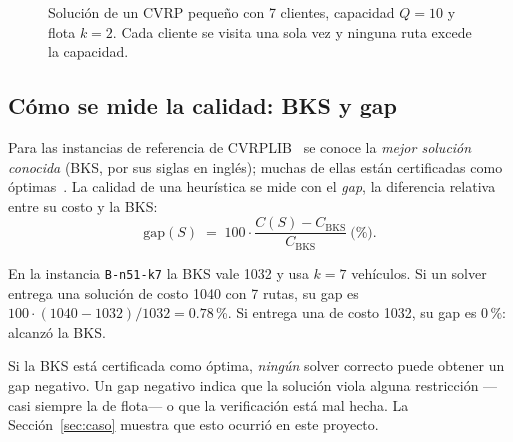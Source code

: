 \documentclass[11pt,a4paper]{article}
\newcommand{\tsl}[1]{\texttt{\small #1}}
\begin{document}
\begin{figure}[H]
\centering
{}
\caption{Solución de un CVRP pequeño con 7 clientes, capacidad $Q=10$ y flota $k=2$. Cada cliente se
visita una sola vez y ninguna ruta excede la capacidad.}
\label{fig:cvrp}
\end{figure}

\subsection{Cómo se mide la calidad: BKS y gap}
Para las instancias de referencia de CVRPLIB~\cite{cvrplib} se conoce la \emph{mejor solución
conocida} (BKS, por sus siglas en inglés); muchas de ellas están certificadas como
óptimas~\cite{queiroga2021}. La calidad de una heurística se mide con el \emph{gap}, la diferencia
relativa entre su costo y la BKS:
\begin{equation}
\mathrm{gap}(S) \;=\; 100\cdot\frac{C(S)-C_{\mathrm{BKS}}}{C_{\mathrm{BKS}}}\ \text{(\%)}.
\label{eq:gap}
\end{equation}

\begin{ejemplo}
En la instancia \tsl{B-n51-k7} la BKS vale 1032 y usa $k=7$ vehículos. Si un solver entrega una
solución de costo 1040 con 7 rutas, su gap es $100\cdot(1040-1032)/1032 = 0.78$\,\%. Si entrega una
de costo 1032, su gap es 0\,\%: alcanzó la BKS.
\end{ejemplo}

\begin{ideaclave}
Si la BKS está certificada como óptima, \emph{ningún} solver correcto puede obtener un gap negativo.
Un gap negativo indica que la solución viola alguna restricción ---casi siempre la de flota--- o que
la verificación está mal hecha. La Sección~\ref{sec:caso} muestra que esto ocurrió en este
proyecto.
\end{ideaclave}
\end{document}

